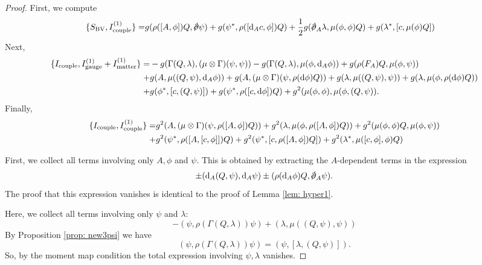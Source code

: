 \documentclass[10pt, oneside]{article}
\begin{document}
\begin{proof}
First, we compute
\begin{align*}
\{S_{\rm BV} , I^{(1)}_{\rm couple}\} = & g (\rho([A, \phi]) Q, \sd \dd \psi) + g (\psi^*, \rho([\d_A c, \phi]) Q) + \frac{1}{2} g (\sd \dd_A \lambda, \mu(\phi, \phi) Q) + g (\lambda^*, [c, \mu(\phi) Q]) 
\end{align*}
Next,
\begin{align*}
\{I_{\rm couple} , I^{(1)}_{\rm gauge} + I^{(1)}_{\rm matter}\} = & - g (\Gamma(Q, \lambda), (\mu \otimes \Gamma)(\psi,\psi)) - g (\Gamma(Q, \lambda), \mu(\phi, {\rm d}_A \phi)) + g (\rho(F_A)Q , \mu(\phi, \psi)) \\ + & g (A, \mu((Q, \psi), {\rm d}_A \phi)) + g (A, (\mu \otimes \Gamma)(\psi, \rho({\rm d} \phi) Q)) + g (\lambda, \mu((Q, \psi), \psi)) + g (\lambda, \mu(\phi, \rho({\rm d} \phi)  Q)) \\ + & g (\phi^*, [c, (Q,\psi)])  + g (\psi^*, \rho( [c ,{\rm d} \phi ]) Q) + g^2 (\mu(\phi, \phi) , \mu(\phi, (Q, \psi)) . 
\end{align*}
Finally,
\begin{align*}
\{I_{\rm couple}, I^{(1)}_{\rm couple}\} = & g^2 (A, (\mu \otimes \Gamma)(\psi, \rho([A, \phi]) Q)) + g^2 (\lambda, \mu(\phi, \rho([A, \phi]) Q)) + g^2 (\mu(\phi, \phi)Q , \mu(\phi, \psi)) \\
+ &g^2 (\psi^*, \rho([A, [c,\phi]]) Q) + g^2 (\psi^*, [c, \rho([A,\phi])Q]) + g^2 (\lambda^*, \mu([c,\phi], \phi) Q)  
\end{align*}

First, we collect all terms involving only $A, \phi$ and $\psi$.
This is obtained by extracting the $A$-dependent terms in the expression
\[
\pm (\d_A(Q, \psi), \d_A \psi) \pm (\rho(\d_A\phi)Q, \sd \dd_A \psi) .
\]
The proof that this expression vanishes is identical to the proof of Lemma \ref{lem: hyper1}. 

Here, we collect all terms involving only $\psi$ and $\lambda$:
\[
- (\psi, \rho(\Gamma(Q, \lambda)) \psi) + (\lambda, \mu((Q,\psi), \psi))
\]
By Proposition \ref{prop: new3psi} we have
\[
(\psi, \rho(\Gamma(Q, \lambda)) \psi) = (\psi, [\lambda, (Q, \psi)] ) .
\]
So, by the moment map condition the total expression involving $\psi, \lambda$ vanishes. 


\end{proof}
\end{document}
